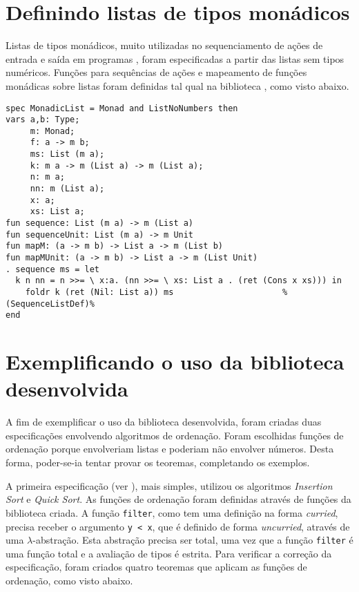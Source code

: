 \section{Definindo listas de tipos monádicos}
Listas de tipos monádicos, muito utilizadas no sequenciamento de ações de entrada e saída em programas \Haskell, foram especificadas a partir das listas sem tipos numéricos.
Funções para sequências de ações e mapeamento de funções monádicas sobre listas foram definidas tal qual na biblioteca \Prelude, como visto abaixo.

\begin{Verbatim}
spec MonadicList = Monad and ListNoNumbers then
vars a,b: Type;
     m: Monad;
     f: a -> m b;
     ms: List (m a);
     k: m a -> m (List a) -> m (List a);
     n: m a;
     nn: m (List a);
     x: a;
     xs: List a;
fun sequence: List (m a) -> m (List a)
fun sequenceUnit: List (m a) -> m Unit
fun mapM: (a -> m b) -> List a -> m (List b)
fun mapMUnit: (a -> m b) -> List a -> m (List Unit)
. sequence ms = let
  k n nn = n >>= \ x:a. (nn >>= \ xs: List a . (ret (Cons x xs))) in
    foldr k (ret (Nil: List a)) ms                      %(SequenceListDef)%
end
\end{Verbatim}

\section{Exemplificando o uso da biblioteca desenvolvida}
A fim de exemplificar o uso da biblioteca desenvolvida, foram criadas duas especificações envolvendo algoritmos de ordenação.
Foram escolhidas funções de ordenação porque envolveriam listas e poderiam não envolver números.
Desta forma, poder-se-ia tentar provar os teoremas, completando os exemplos.

A primeira especificação (ver ), mais simples, utilizou os algoritmos \textit{Insertion Sort} e \textit{Quick Sort}.
As funções de ordenação foram definidas através de funções da biblioteca criada.
A função \Verb.filter., como tem uma definição na forma \textit{curried}, precisa receber o argumento \Verb.y < x., que é definido de forma \textit{uncurried}, através de uma $\lambda$-abstração.
Esta abstração precisa ser total, uma vez que a função \Verb.filter. é uma função total e a avaliação de tipos é estrita.
Para verificar a correção da especificação, foram criados quatro teoremas que aplicam as funções de ordenação, como visto abaixo.

